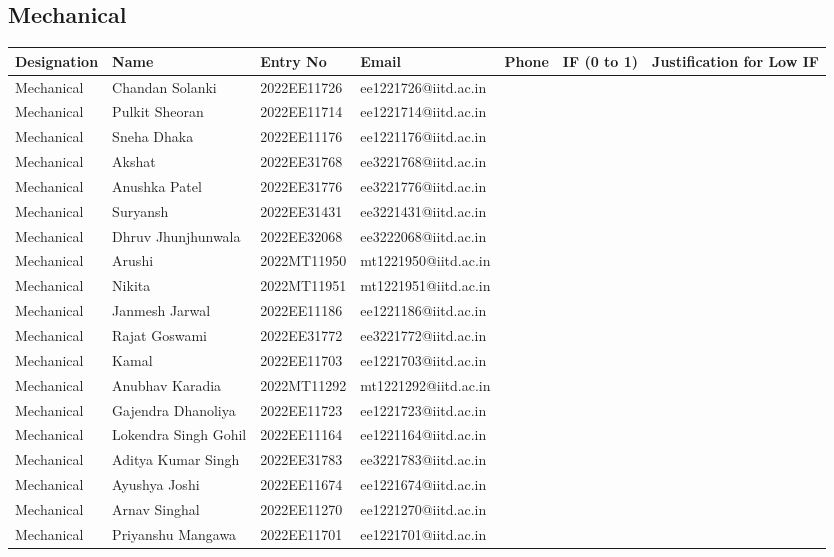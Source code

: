\documentclass[a4paper,12pt]{article}
\begin{document}
\subsection{Mechanical}
\begin{longtable}[c]{|l|l|l|l|l|l|l|}
\hline
\textbf{Designation} & \textbf{Name} & \textbf{Entry No} & \textbf{Email} & \textbf{Phone} & \textbf{IF (0 to 1)} & \textbf{Justification for Low IF} \\
\hline
Mechanical & Chandan Solanki & 2022EE11726 & ee1221726@iitd.ac.in &  &  &  \\ \hline
Mechanical & Pulkit Sheoran & 2022EE11714 & ee1221714@iitd.ac.in &  &  &  \\ \hline
Mechanical & Sneha Dhaka & 2022EE11176 & ee1221176@iitd.ac.in &  &  &  \\ \hline
Mechanical & Akshat & 2022EE31768 & ee3221768@iitd.ac.in &  &  &  \\ \hline
Mechanical & Anushka Patel & 2022EE31776 & ee3221776@iitd.ac.in &  &  &  \\ \hline
Mechanical & Suryansh & 2022EE31431 & ee3221431@iitd.ac.in &  &  &  \\ \hline
Mechanical & Dhruv Jhunjhunwala & 2022EE32068 & ee3222068@iitd.ac.in &  &  &  \\ \hline
Mechanical & Arushi & 2022MT11950 & mt1221950@iitd.ac.in &  &  &  \\ \hline
Mechanical & Nikita & 2022MT11951 & mt1221951@iitd.ac.in &  &  &  \\ \hline
Mechanical & Janmesh Jarwal & 2022EE11186 & ee1221186@iitd.ac.in &  &  &  \\ \hline
Mechanical & Rajat Goswami & 2022EE31772 & ee3221772@iitd.ac.in &  &  &  \\ \hline
Mechanical & Kamal & 2022EE11703 & ee1221703@iitd.ac.in &  &  &  \\ \hline
Mechanical & Anubhav Karadia & 2022MT11292 & mt1221292@iitd.ac.in &  &  &  \\ \hline
Mechanical & Gajendra Dhanoliya & 2022EE11723 & ee1221723@iitd.ac.in &  &  &  \\ \hline
Mechanical & Lokendra Singh Gohil & 2022EE11164 & ee1221164@iitd.ac.in &  &  &  \\ \hline
Mechanical & Aditya Kumar Singh & 2022EE31783 & ee3221783@iitd.ac.in &  &  &  \\ \hline
Mechanical & Ayushya Joshi & 2022EE11674 & ee1221674@iitd.ac.in &  &  &  \\ \hline
Mechanical & Arnav Singhal & 2022EE11270 & ee1221270@iitd.ac.in &  &  &  \\ \hline
Mechanical & Priyanshu Mangawa & 2022EE11701 & ee1221701@iitd.ac.in &  &  &  \\ \hline
\end{longtable}
\end{document}
